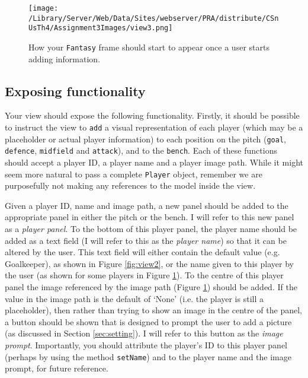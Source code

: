\documentclass[11pt]{article}
\begin{document}
\begin{figure}[htbp]
\begin{center}
\texttt{[image: /Library/Server/Web/Data/Sites/webserver/PRA/distribute/CSnUsTh4/Assignment3Images/view3.png]}
\caption{How your \texttt{Fantasy} frame should start to appear once a user starts adding information.}
\label{fig:view3}
\end{center}
\end{figure}

\subsection{Exposing functionality}
\label{sec:exposing}

Your view should expose the following functionality. Firstly, it should be possible to instruct the view to \texttt{add} a visual representation of each player (which may be a placeholder or actual player information) to each position on the pitch (\texttt{goal}, \texttt{defence}, \texttt{midfield} and \texttt{attack}), and to the \texttt{bench}. Each of these functions should accept a player ID, a player name and a player image path. While it might seem more natural to pass a complete \texttt{Player} object, remember we are purposefully not making any references to the model inside the view. 

Given a player ID, name and image path, a new panel should be added to the appropriate panel in either the pitch or the bench. I will refer to this new panel as a \emph{player panel}. To the bottom of this player panel, the player name should be added as a text field (I will refer to this as the \emph{player name}) so that it can be altered by the user. This text field will either contain the default value (e.g. Goalkeeper), as shown in Figure \ref{fig:view2}, or the name given to this player by the user (as shown for some players in Figure \ref{fig:view3}). To the centre of this player panel the image referenced by the image path (Figure \ref{fig:view3}) should be added. If the value in the image path is the default of  `None' (i.e. the player is still a placeholder), then rather than trying to show an image in the centre of the panel, a button should be shown that is designed to prompt the user to add a picture (as discussed in Section \ref{sec:setting}). I will refer to this button as the \emph{image prompt}. Importantly, you should attribute the player's ID to this player panel (perhaps by using the method \texttt{setName}) and to the player name and the image prompt, for future reference.
\end{document}
